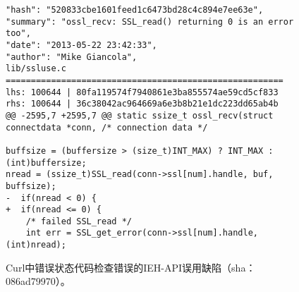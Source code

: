 \begin{figure}[b]
	\centering
\begin{lstlisting}
"hash": "520833cbe1601feed1c6473bd28c4c894e7ee63e",
"summary": "ossl_recv: SSL_read() returning 0 is an error too",
"date": "2013-05-22 23:42:33",
"author": "Mike Giancola",
lib/ssluse.c
=======================================================
lhs: 100644 | 80fa119574f7940861e3ba855574ae59cd5cf833
rhs: 100644 | 36c38042ac964669a6e3b8b21e1dc223dd65ab4b
@@ -2595,7 +2595,7 @@ static ssize_t ossl_recv(struct connectdata *conn, /* connection data */

buffsize = (buffersize > (size_t)INT_MAX) ? INT_MAX : (int)buffersize;
nread = (ssize_t)SSL_read(conn->ssl[num].handle, buf, buffsize);
-  if(nread < 0) {
+  if(nread <= 0) {
	/* failed SSL_read */
	int err = SSL_get_error(conn->ssl[num].handle, (int)nread);

\end{lstlisting}
	\caption{
	Curl中错误状态代码检查错误的IEH-API误用缺陷（sha：086ad79970）。
	}
	\label{fig:2-3-ieh-2}
\end{figure}